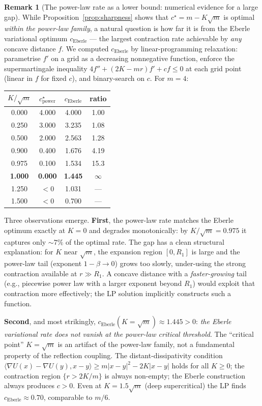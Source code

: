 \documentclass[11pt]{article}
\theoremstyle{definition}
\newtheorem{remark}[theorem]{Remark}
\newcommand{\abs}[1]{\left\lvert #1 \right\rvert}
\begin{document}
\begin{remark}[The power-law rate as a lower bound: numerical evidence for a large gap]\label{rmk:gap}
While Proposition~\ref{prop:sharpness} shows that $c^\star = m - K\sqrt m$ is optimal \emph{within the power-law family}, a natural question is how far it is from the Eberle variational optimum $c_{\mathrm{Eberle}}$ --- the largest contraction rate achievable by \emph{any} concave distance $f$. We computed $c_{\mathrm{Eberle}}$ by linear-programming relaxation: parametrise $f'$ on a grid as a decreasing nonnegative function, enforce the supermartingale inequality $4 f'' + (2K - mr)f' + c f \le 0$ at each grid point (linear in $f$ for fixed $c$), and binary-search on $c$. For $m = 4$:

\begin{center}
\begin{tabular}{cccc}
\hline
$K/\sqrt m$ & $c^\star_{\text{power}}$ & $c_{\text{Eberle}}$ & ratio \\
\hline
0.000 & 4.000 & 4.000 & 1.00 \\
0.250 & 3.000 & 3.235 & 1.08 \\
0.500 & 2.000 & 2.563 & 1.28 \\
0.900 & 0.400 & 1.676 & 4.19 \\
0.975 & 0.100 & 1.534 & 15.3 \\
\textbf{1.000} & \textbf{0.000} & \textbf{1.445} & $\boldsymbol\infty$ \\
1.250 & $<0$ & 1.031 & --- \\
1.500 & $<0$ & 0.700 & --- \\
\hline
\end{tabular}
\end{center}

Three observations emerge. \textbf{First}, the power-law rate matches the Eberle optimum exactly at $K = 0$ and degrades monotonically: by $K/\sqrt m = 0.975$ it captures only $\sim\!7\%$ of the optimal rate. The gap has a clean structural explanation: for $K$ near $\sqrt m$, the expansion region $[0, R_1]$ is large and the power-law tail (exponent $1 - \beta \to 0$) grows too slowly, under-using the strong contraction available at $r \gg R_1$. A concave distance with a \emph{faster-growing} tail (e.g., piecewise power law with a larger exponent beyond $R_1$) would exploit that contraction more effectively; the LP solution implicitly constructs such a function.

\textbf{Second}, and most strikingly, $c_{\mathrm{Eberle}}(K = \sqrt m) \approx 1.445 > 0$: \emph{the Eberle variational rate does not vanish at the power-law critical threshold}. The ``critical point'' $K = \sqrt m$ is an artifact of the power-law family, not a fundamental property of the reflection coupling. The distant-dissipativity condition $\langle \nabla U(x) - \nabla U(y), x - y\rangle \ge m\abs{x-y}^2 - 2K\abs{x-y}$ holds for all $K \ge 0$; the contraction region $\{r > 2K/m\}$ is always non-empty; the Eberle construction always produces $c > 0$. Even at $K = 1.5\sqrt m$ (deep supercritical) the LP finds $c_{\mathrm{Eberle}} \approx 0.70$, comparable to $m/6$.


\end{remark}
\end{document}
